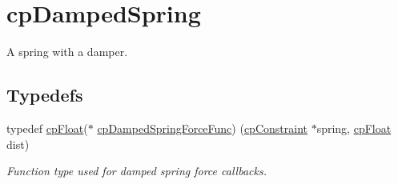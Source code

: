 \hypertarget{group__cp_damped_spring}{}\section{cp\+Damped\+Spring}
\label{group__cp_damped_spring}


A spring with a damper.  


\subsection*{Typedefs}
\begin{DoxyCompactItemize}
\item 
\hypertarget{group__cp_damped_spring_gad88d8466e0057d4ad05183fb14fa274d}{}typedef \hyperlink{group__basic_types_gac1ed65573e035bf892505768c852d8d3}{cp\+Float}($\ast$ \hyperlink{group__cp_damped_spring_gad88d8466e0057d4ad05183fb14fa274d}{cp\+Damped\+Spring\+Force\+Func}) (\hyperlink{structcp_constraint}{cp\+Constraint} $\ast$spring, \hyperlink{group__basic_types_gac1ed65573e035bf892505768c852d8d3}{cp\+Float} dist)\label{group__cp_damped_spring_gad88d8466e0057d4ad05183fb14fa274d}

\begin{DoxyCompactList}\small\item\em Function type used for damped spring force callbacks. \end{DoxyCompactList}\end{DoxyCompactItemize}
